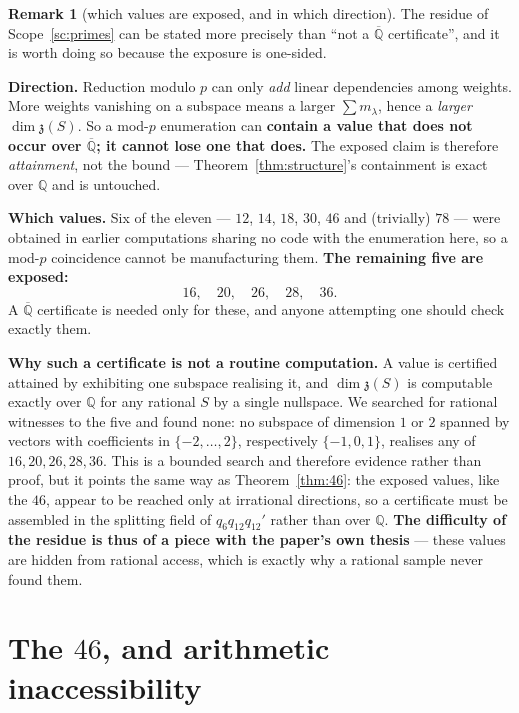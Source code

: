 \documentclass[11pt,a4paper]{article}
\theoremstyle{definition}
\newtheorem{remark}[theorem]{Remark}
\theoremstyle{remark}
\newcommand{\z}{\mathfrak{z}}
\newcommand{\Q}{\mathbb{Q}}
\begin{document}
\begin{remark}[which values are exposed, and in which direction]\label{rem:exposed}
The residue of Scope~\ref{sc:primes} can be stated more precisely than ``not a $\overline{\Q}$
certificate'', and it is worth doing so because the exposure is one-sided.

\textbf{Direction.} Reduction modulo $p$ can only \emph{add} linear dependencies among weights.
More weights vanishing on a subspace means a larger $\sum m_\lambda$, hence a \emph{larger}
$\dim\z(S)$. So a mod-$p$ enumeration can \textbf{contain a value that does not occur over
$\overline{\Q}$; it cannot lose one that does.} The exposed claim is therefore \emph{attainment},
not the bound --- Theorem~\ref{thm:structure}'s containment is exact over $\Q$ and is untouched.

\textbf{Which values.} Six of the eleven --- $12$, $14$, $18$, $30$, $46$ and (trivially) $78$ ---
were obtained in earlier computations sharing no code with the enumeration here, so a mod-$p$
coincidence cannot be manufacturing them. \textbf{The remaining five are exposed:}
\[
   16,\quad 20,\quad 26,\quad 28,\quad 36 .
\]
A $\overline{\Q}$ certificate is needed only for these, and anyone attempting one should check
exactly them.

\textbf{Why such a certificate is not a routine computation.} A value is certified attained by
exhibiting one subspace realising it, and $\dim\z(S)$ is computable exactly over $\Q$ for any
rational $S$ by a single nullspace. We searched for rational witnesses to the five and found
none: no subspace of dimension $1$ or $2$ spanned by vectors with coefficients in
$\{-2,\dots,2\}$, respectively $\{-1,0,1\}$, realises any of $16,20,26,28,36$. This is a bounded
search and therefore evidence rather than proof, but it points the same way as
Theorem~\ref{thm:46}: the exposed values, like the $46$, appear to be reached only at irrational
directions, so a certificate must be assembled in the splitting field of $q_6q_{12}q_{12}'$ rather
than over $\Q$. \textbf{The difficulty of the residue is thus of a piece with the paper's own
thesis} --- these values are hidden from rational access, which is exactly why a rational sample
never found them.
\end{remark}

\section{The $46$, and arithmetic inaccessibility}\label{sec:46}
\end{document}
